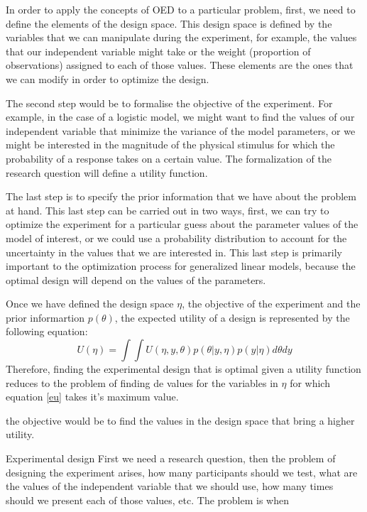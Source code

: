 \documentclass[preprint,review,12pt]{elsarticle}
\begin{document}
In order to apply the concepts of OED to a particular problem, first, we need to define the elements of the design space. This design space is defined by the variables that we can manipulate during the experiment, for example, the values that our independent variable might take or the weight (proportion of observations) assigned to each of those values. These elements are the ones that we can modify in order to optimize the design.

The second step would be to formalise the objective of the experiment. For example, in the case of a logistic model, we might want to find the values of our independent variable that minimize the variance of the model parameters, or we might be interested in the magnitude of the physical stimulus for which the probability of a response takes on a certain value. The formalization of the research question will define a utility function.

The last step is to specify the prior information that we have about the problem at hand. This last step can be carried out in two ways, first, we can try to optimize the experiment for a particular guess about the parameter values of the model of interest, or we could use a probability distribution to account for the uncertainty in the values that we are interested in. This last step is primarily important to the optimization process for generalized linear models, because the optimal design will depend on the values of the parameters.

Once we have defined the design space $\eta$, the objective of the experiment and the prior informartion $p(\theta)$, the expected utility of a design is represented by the following equation:
\begin{equation}
U(\eta)=\int \int U(\eta,y,\theta)p(\theta|y,\eta)p(y|\eta)d\theta dy
\label{eu}
\end{equation}
Therefore, finding the experimental design that is optimal given a utility function reduces to the problem of finding de values for the variables in $\eta$ for which equation \ref{eu} takes it's maximum value.

the objective would be to find the values in the design space that bring a higher utility.

Experimental design
First we need a research question, then the problem of designing the experiment arises, how many participants should we test, what are the values of the independent variable that we should use, how many times should we present each of those values, etc. The problem is when 
\end{document}
